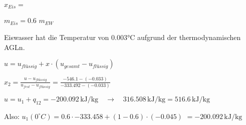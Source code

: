 \( x_{Eis} = \)  

\( m_{Eis} = 0.6 \)  
\( m_{EW} \)  

Eiswasser hat die Temperatur von 0.003°C aufgrund der thermodynamischen AGLn.  

\( u = u_{flüssig} + x \cdot (u_{gesamt} - u_{flüssig}) \)  

\( x_2 = \frac{u - u_{flüssig}}{u_{fest} - u_{flüssig}} = \frac{-546.1 - (-0.033)}{-333.492 - (-0.033)} \)  

\( u = u_1 + q_{12} = -200.092 \, \text{kJ/kg} \quad \rightarrow \quad 316.508 \, \text{kJ/kg} = 516.6 \, \text{kJ/kg} \)  

Also:  
\( u_1 (0^\circ C) = 0.6 \cdot -333.458 + (1 - 0.6) \cdot (-0.045) \)  
\( = -200.092 \, \text{kJ/kg} \)